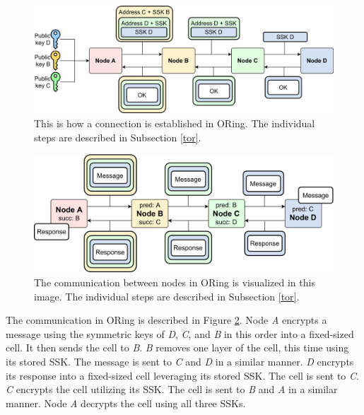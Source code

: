 \begin{figure}[ht!]
  \centering
  \includegraphics[width = \textwidth]{Images/OREstablishment.png}
  \caption{This is how a connection is established in ORing. The individual steps are described in Subsection \ref{tor}.}
  \label{OREstablishment}
\end{figure}

\begin{figure}[ht!]
  \centering
  \includegraphics[width = \textwidth]{Images/ORCom.png}
  \caption{The communication between nodes in ORing is visualized in this image. The individual steps are described in Subsection \ref{tor}.}
  \label{ORCom}
\end{figure}

The communication in ORing is described in Figure \ref{ORCom}. Node \textit{A} encrypts a message using the symmetric keys of \textit{D}, \textit{C}, and \textit{B} in this order into a fixed-sized cell. It then sends the cell to \textit{B}. \textit{B} removes one layer of the cell, this time using its stored SSK. The message is sent to \textit{C} and \textit{D} in a similar manner. \textit{D} encrypts its response into a fixed-sized cell leveraging its stored SSK. The cell is sent to \textit{C}. \textit{C} encrypts the cell utilizing its SSK. The cell is sent to \textit{B} and \textit{A} in a similar manner. Node \textit{A} decrypts the cell using all three SSKs. 

